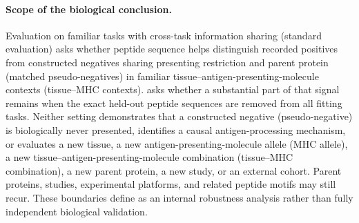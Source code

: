 \paragraph{Scope of the biological conclusion.}
Evaluation on familiar tasks with cross-task information sharing (standard evaluation) asks whether peptide sequence helps distinguish recorded positives from constructed negatives sharing presenting restriction and parent protein (matched pseudo-negatives) in familiar tissue--antigen-presenting-molecule contexts (tissue--MHC contexts). \plainPeptideOOF{} asks whether a substantial part of that signal remains when the exact held-out peptide sequences are removed from all fitting tasks. Neither setting demonstrates that a constructed negative (pseudo-negative) is biologically never presented, identifies a causal antigen-processing mechanism, or evaluates a new tissue, a new antigen-presenting-molecule allele (MHC allele), a new tissue--antigen-presenting-molecule combination (tissue--MHC combination), a new parent protein, a new study, or an external cohort. Parent proteins, studies, experimental platforms, and related peptide motifs may still recur. These boundaries define \plainPeptideOOF{} as an internal robustness analysis rather than fully independent biological validation.
